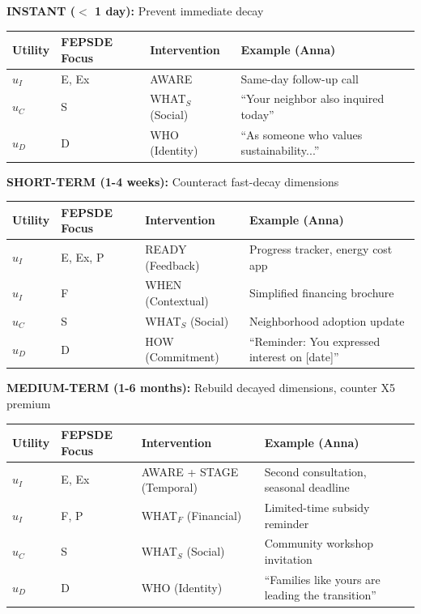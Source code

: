 \begin{tcolorbox}[colback=green!5!white, colframe=green!75!black, title=Minimal Maintenance Portfolio: Time Horizon × Utility Level × FEPSDE]

\textbf{INSTANT ($<$ 1 day):} Prevent immediate decay
\begin{center}
\renewcommand{\arraystretch}{1.1}
\begin{tabular}{@{}llll@{}}
\toprule
\textbf{Utility} & \textbf{FEPSDE Focus} & \textbf{Intervention} & \textbf{Example (Anna)} \\
\midrule
$u_I$ & E, Ex & AWARE & Same-day follow-up call \\
$u_C$ & S & WHAT$_S$ (Social) & ``Your neighbor also inquired today'' \\
$u_D$ & D & WHO (Identity) & ``As someone who values sustainability...'' \\
\bottomrule
\end{tabular}
\end{center}

\textbf{SHORT-TERM (1-4 weeks):} Counteract fast-decay dimensions
\begin{center}
\renewcommand{\arraystretch}{1.1}
\begin{tabular}{@{}llll@{}}
\toprule
\textbf{Utility} & \textbf{FEPSDE Focus} & \textbf{Intervention} & \textbf{Example (Anna)} \\
\midrule
$u_I$ & E, Ex, P & READY (Feedback) & Progress tracker, energy cost app \\
$u_I$ & F & WHEN (Contextual) & Simplified financing brochure \\
$u_C$ & S & WHAT$_S$ (Social) & Neighborhood adoption update \\
$u_D$ & D & HOW (Commitment) & ``Reminder: You expressed interest on [date]'' \\
\bottomrule
\end{tabular}
\end{center}

\textbf{MEDIUM-TERM (1-6 months):} Rebuild decayed dimensions, counter X5 premium
\begin{center}
\renewcommand{\arraystretch}{1.1}
\begin{tabular}{@{}llll@{}}
\toprule
\textbf{Utility} & \textbf{FEPSDE Focus} & \textbf{Intervention} & \textbf{Example (Anna)} \\
\midrule
$u_I$ & E, Ex & AWARE + STAGE (Temporal) & Second consultation, seasonal deadline \\
$u_I$ & F, P & WHAT$_F$ (Financial) & Limited-time subsidy reminder \\
$u_C$ & S & WHAT$_S$ (Social) & Community workshop invitation \\
$u_D$ & D & WHO (Identity) & ``Families like yours are leading the transition'' \\
\bottomrule
\end{tabular}
\end{center}


\end{tcolorbox}
